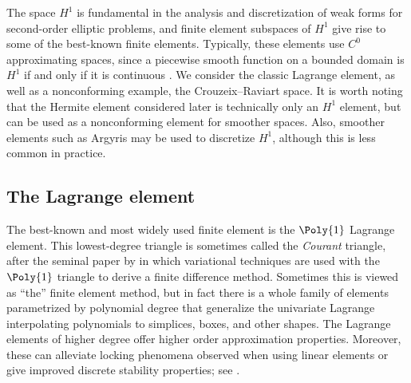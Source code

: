 The space $H^1$ is fundamental in the analysis and discretization of
weak forms for second-order elliptic problems, and finite element
subspaces of $H^1$ give rise to some of the best-known finite
elements. Typically, these elements use $C^0$ approximating spaces,
since a piecewise smooth function on a bounded domain is $H^1$ if and
only if it is continuous \citep[Theorem 5.2]{Braess2007}. We consider
the classic Lagrange element, as well as a nonconforming example, the
Crouzeix--Raviart space. It is worth noting that the Hermite element
considered later is technically only an $H^1$ element, but can be used
as a nonconforming element for smoother spaces.  Also, smoother
elements such as Argyris may be used to discretize $H^1$, although
this is less common in practice.

\vspace*{7pt}
\subsection{The Lagrange element}

The best-known and most widely used finite element is the $\Poly{1}$
Lagrange element. This lowest-degree triangle is sometimes called the
\emph{Courant} triangle, after the seminal paper by \citet{Courant1943}
in which variational techniques are used with the $\Poly{1}$ triangle
to derive a finite difference method. Sometimes this is viewed as
``the'' finite element method, but in fact there is a whole family of
elements parametrized by polynomial degree that generalize the
univariate Lagrange interpolating polynomials to simplices, boxes, and
other shapes. The Lagrange elements of higher degree offer higher
order approximation properties. Moreover, these can alleviate locking
phenomena observed when using linear elements or give improved
discrete stability properties; see \citet{TaylorHood1973,
  ScottVogelius1985}.

